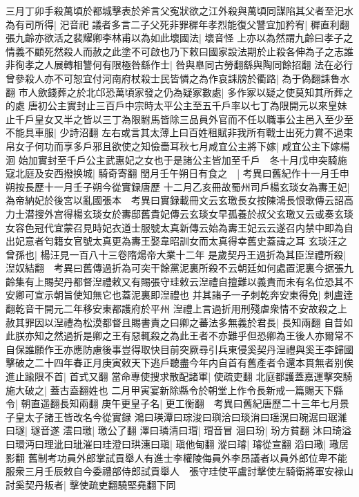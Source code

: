 三月丁卯手殺萬頃於都城擊表於斧言父寃狀欲之江外殺與萬頃同謀陷其父者至汜水為有司所得|{
	汜音祀}
議者多言二子父死非罪穉年孝烈能復父讐宜加矜宥|{
	穉直利翻}
張九齡亦欲活之裴耀卿李林甫以為如此壞國法|{
	壞音怪}
上亦以為然謂九齡曰孝子之情義不顧死然殺人而赦之此塗不可啟也乃下敕曰國家設法期於止殺各伸為子之志誰非徇孝之人展轉相讐何有限極咎繇作士|{
	咎與臯同古勞翻繇與陶同餘招翻}
法在必行曾參殺人亦不可恕宜付河南府杖殺士民皆憐之為作哀誄牓於衢路|{
	為于偽翻誄魯水翻}
市人歛錢葬之於北邙恐萬頃家發之仍為疑冢數處|{
	多作冢以疑之使莫知其所葬之的處}
唐初公主實封止三百戶中宗時太平公主至五千戶率以七丁為限開元以來皇妹止千戶皇女又半之皆以三丁為限駙馬皆除三品員外官而不任以職事公主邑入至少至不能具車服|{
	少詩沼翻}
左右或言其太薄上曰百姓租賦非我所有戰士出死力賞不過束帛女子何功而享多戶邪且欲使之知儉嗇耳秋七月咸宜公主將下嫁|{
	咸宜公主下嫁楊洄}
始加實封至千戶公主武惠妃之女也于是諸公主皆加至千戶　冬十月戊申突騎施寇北庭及安西撥换城|{
	騎奇寄翻}
閏月壬午朔日有食之　|{
	考異曰舊紀作十一月壬申朔按長歷十一月壬子朔今從實録唐歷}
十二月乙亥冊故蜀州司戶楊玄琰女為夀王妃|{
	為帝納妃於後宮以亂國張本　考異曰實録載冊文云玄璬長女按陳鴻長恨歌傳云詔高力士潜搜外宫得楊玄琰女於夀邸舊貴妃傳云玄琰女早孤養於叔父玄璬又云或奏玄琰女容色冠代宜蒙召見時妃衣道士服號太真新傳云始為夀王妃云云遂召内禁中即為自出妃意者匄籍女官號太真更為夀王娶韋昭訓女而太真得幸舊史蓋諱之耳}
玄琰汪之曾孫也|{
	楊汪見一百八十三卷隋煬帝大業十二年}
是歲契丹王過折為其臣湼禮所殺|{
	湼奴結翻　考異曰舊傳過折為可突干餘黨泥裏所殺不云朝廷如何處置泥裏今据張九齡集有上賜契丹都督湼禮敕又有賜張守珪敕云湼禮自擅難以義責而未有名位恐其不安卿可宣示朝旨使知無它也蓋泥裏即湼禮也}
并其諸子一子刺乾奔安東得免|{
	刺盧逹翻乾音干開元二年移安東都護府於平州}
湼禮上言過折用刑殘虐衆情不安故殺之上赦其罪因以湼禮為松漠都督且賜書責之曰卿之蕃法多無義於君長|{
	長知兩翻}
自昔如此朕亦知之然過折是卿之王有惡輒殺之為此王者不亦難乎但恐卿為王後人亦爾常不自保誰願作王亦應防慮後事豈得取快目前突厥尋引兵東侵奚契丹湼禮與奚王李歸國擊破之二十四年春正月庚寅敕天下逃戶聽盡今年内自首有舊產者令還本貫無者别俟進止踰限不首|{
	首式又翻}
當命專使搜求散配諸軍|{
	使疏吏翻}
北庭都護蓋嘉運擊突騎施大破之|{
	蓋古盍翻姓也}
二月甲寅宴新除縣令於朝堂上作令長新戒一篇賜天下縣令|{
	朝直遥翻長知兩翻}
庚午更皇子名|{
	更工衡翻　考異曰舊紀唐歷二十三年七月景子皇太子諸王皆改名今從實録}
鴻曰瑛潭曰琮浚曰璵洽曰琰㳙曰瑶滉曰琬涺曰琚濰曰璲|{
	璲音遂}
澐曰璬|{
	璬公了翻}
澤曰璘清曰瑁|{
	瑁音冒}
洄曰玢|{
	玢方貧翻}
沐曰琦溢曰環沔曰理泚曰玼漼曰珪澄曰珙潓曰瑱|{
	瑱他甸翻}
漎曰璿|{
	璿從宣翻}
滔曰璥|{
	璥居影翻}
舊制考功員外郎掌試貢舉人有進士李權陵侮員外李昂議者以員外郎位卑不能服衆三月壬辰敕自今委禮部侍郎試貢舉人　張守珪使平盧討擊使左騎衛將軍安禄山討奚契丹叛者|{
	擊使疏吏翻驍堅堯翻下同}
